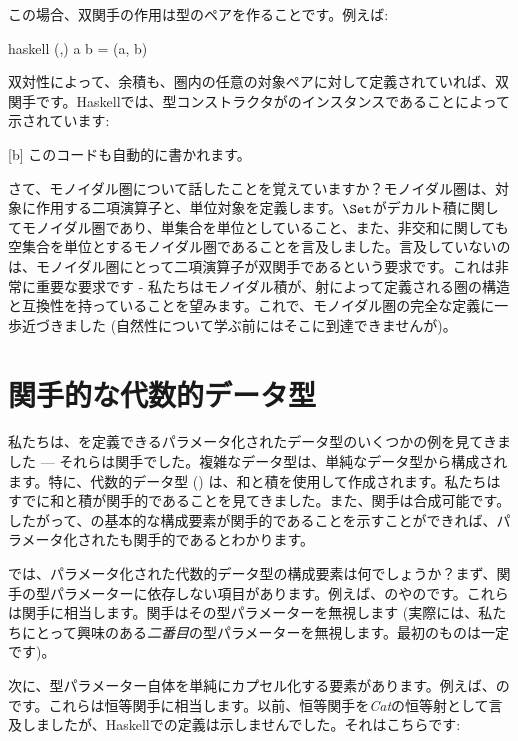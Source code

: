 この場合、双関手の作用は型のペアを作ることです。例えば: 

\begin{snip}{haskell}
(,) a b = (a, b)
\end{snip}
双対性によって、余積も、圏内の任意の対象ペアに対して定義されていれば、双関手です。Haskellでは、型コンストラクタがのインスタンスであることによって示されています: 

[b]
このコードも自動的に書かれます。

さて、モノイダル圏について話したことを覚えていますか？モノイダル圏は、対象に作用する二項演算子と、単位対象を定義します。$\Set$がデカルト積に関してモノイダル圏であり、単集合を単位としていること、また、非交和に関しても空集合を単位とするモノイダル圏であることを言及しました。言及していないのは、モノイダル圏にとって二項演算子が双関手であるという要求です。これは非常に重要な要求です - 私たちはモノイダル積が、射によって定義される圏の構造と互換性を持っていることを望みます。これで、モノイダル圏の完全な定義に一歩近づきました (自然性について学ぶ前にはそこに到達できませんが)。

\section{関手的な代数的データ型}

私たちは、を定義できるパラメータ化されたデータ型のいくつかの例を見てきました --- それらは関手でした。複雑なデータ型は、単純なデータ型から構成されます。特に、代数的データ型 () は、和と積を使用して作成されます。私たちはすでに和と積が関手的であることを見てきました。また、関手は合成可能です。したがって、の基本的な構成要素が関手的であることを示すことができれば、パラメータ化されたも関手的であるとわかります。

では、パラメータ化された代数的データ型の構成要素は何でしょうか？まず、関手の型パラメーターに依存しない項目があります。例えば、のやのです。これらは関手に相当します。関手はその型パラメーターを無視します (実際には、私たちにとって興味のある\emph{二番目}の型パラメーターを無視します。最初のものは一定です)。

次に、型パラメーター自体を単純にカプセル化する要素があります。例えば、のです。これらは恒等関手に相当します。以前、恒等関手を\emph{Cat}の恒等射として言及しましたが、Haskellでの定義は示しませんでした。それはこちらです: 

